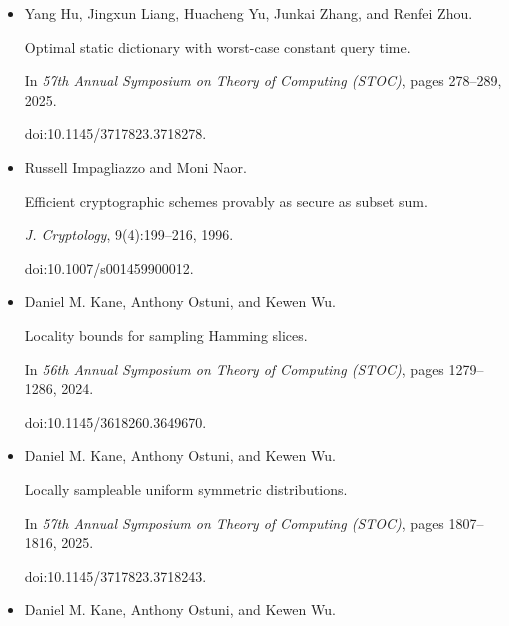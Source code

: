\begin{itemize}
\emph{Found. Trends Theor. Comput. Sci.}, 16(1-2):1–210, 2024.


doi:10.1561/0400000109.





\item[] 
[26]

Yang Hu, Jingxun Liang, Huacheng Yu, Junkai Zhang, and Renfei Zhou.


Optimal static dictionary with worst-case constant query time.


In \emph{57th Annual Symposium on Theory of Computing (STOC)}, pages
278–289, 2025.


doi:10.1145/3717823.3718278.





\item[] 
[27]

Russell Impagliazzo and Moni Naor.


Efficient cryptographic schemes provably as secure as subset sum.


\emph{J. Cryptology}, 9(4):199–216, 1996.


doi:10.1007/s001459900012.





\item[] 
[28]

Daniel M. Kane, Anthony Ostuni, and Kewen Wu.


Locality bounds for sampling Hamming slices.


In \emph{56th Annual Symposium on Theory of Computing (STOC)}, pages
1279–1286, 2024.


doi:10.1145/3618260.3649670.





\item[] 
[29]

Daniel M. Kane, Anthony Ostuni, and Kewen Wu.


Locally sampleable uniform symmetric distributions.


In \emph{57th Annual Symposium on Theory of Computing (STOC)}, pages
1807–1816, 2025.


doi:10.1145/3717823.3718243.





\item[] 
[30]

Daniel M. Kane, Anthony Ostuni, and Kewen Wu.



\end{itemize}
